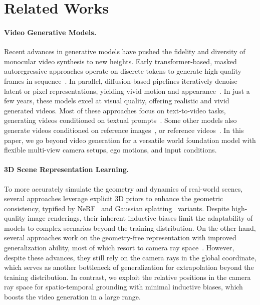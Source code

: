 \section{Related Works}

\paragraph{Video Generative Models.}
Recent advances in generative models have pushed the fidelity and diversity of monocular video synthesis to new heights. Early transformer-based, masked autoregressive approaches operate on discrete tokens to generate high-quality frames in sequence~\cite{yan2021videogpt, micheli2022transformers, ge2022long, villegas22phenaki, yu2023magvit}. In parallel, diffusion-based pipelines iteratively denoise latent or pixel representations, yielding vivid motion and appearance~\cite{blattmann2023stable, openai2024sora, agarwal2025cosmos, polyak2024movie, runway2024gen3, ge2024preservecorrelationnoiseprior, ma2025lattelatentdiffusiontransformer, yang2025cogvideoxtexttovideodiffusionmodels}. In just a few years, these models excel at visual quality, offering realistic and vivid generated videos. Most of these approaches focus on text-to-video tasks, generating videos conditioned on textual prompts~\cite{ge2024preservecorrelationnoiseprior, ma2025lattelatentdiffusiontransformer, yang2025cogvideoxtexttovideodiffusionmodels}. Some other models also generate videos conditioned on reference images~\cite{wang2024unianimatetamingunifiedvideo, ren2024consisti2venhancingvisualconsistency}, or reference videos~\cite{liu2024stablev2vstablizingshapeconsistency}. In this paper, we go beyond video generation for a versatile world foundation model with flexible multi-view camera setups, ego motions, and input conditions.

\paragraph{3D Scene Representation Learning.} To more accurately simulate the geometry and dynamics of real-world scenes, several approaches leverage explicit 3D priors to enhance the geometric consistency, typified by NeRF~\cite{mildenhall2021nerf, kerbl20233d} and Gaussian splatting~\cite{chen2025omnireomniurbanscene, yan2024streetgaussiansmodelingdynamic, peng2024desire,zhou2024drivinggaussiancompositegaussiansplatting} variants. Despite high-quality image renderings, their inherent inductive biases limit the adaptability of models to complex scenarios beyond the training distribution. On the other hand, several approaches work on the geometry-free representation with improved generalization ability, most of which resort to camera ray space~\cite{sajjadi2022object,hong2023lrm,jin2024lvsm,jiang2025rayzer}. However, despite these advances, they still rely on the camera rays in the global coordinate, which serves as another bottleneck of generalization for extrapolation beyond the training distribution. In contrast, we exploit the relative positions in the camera ray space for spatio-temporal grounding with minimal inductive biases, which boosts the video generation in a large range.

